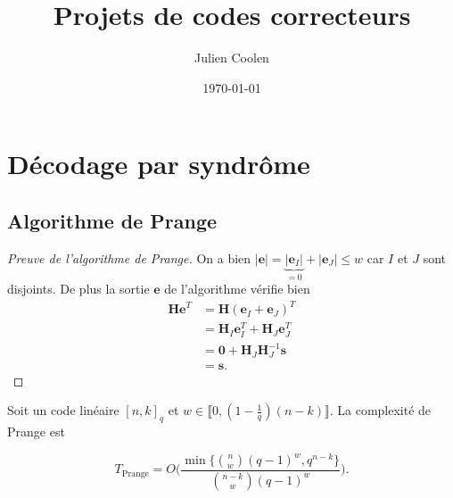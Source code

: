\documentclass{scrartcl}[a4paper,9pt,headings=small,footinclude=false]
\title{Projets de codes correcteurs}
\author{\normalsize Julien Coolen}
\date{\normalsize\today}
\theoremstyle{definition}
\theoremstyle{remark}
\begin{document}
\maketitle
\tableofcontents

\section{Décodage par syndrôme}
\subsection{Algorithme de Prange}

\begin{algorithm}[H]
    \renewcommand{\algorithmcfname}{Algorithme}%
    \SetAlgoLined
\caption{Algorithme de Prange (1962) (type Las Vegas)}
\end{algorithm}
\begin{proof}[Preuve de l'algorithme de Prange]
On a bien $|\textbf{e}|=\underbrace{|\textbf{e}_I|}_{= 0}+|\textbf{e}_J|\leq w$ car $I$ et $J$ sont disjoints.
De plus la sortie $\textbf{e}$ de l'algorithme vérifie bien
\begin{align*}
    \textbf{He}^T &= \textbf{H}(\textbf{e}_I+\textbf{e}_J)^T\\
    &= \textbf{H}_I \textbf{e}_I^T + \textbf{H}_J \textbf{e}_J^T\\
    &= \textbf{0} + \textbf{H}_J \textbf{H}_J^{-1} \textbf{s}\\
    &= \textbf{s}.
\end{align*}
\end{proof}


Soit un code linéaire $[n,k]_q$ et $w\in\llbracket 0, (1-\frac{1}{q})(n-k)\rrbracket$.
La complexité de Prange est

\[ T_{\text{Prange}} = O\Bigg(\frac{\min \big\{ \binom{n}{w}(q-1)^w, q^{n-k} \big\}}{\binom{n-k}{w}(q-1)^w}\Bigg). \]
\end{document}
